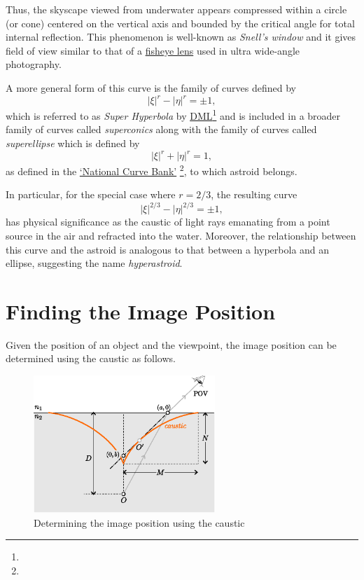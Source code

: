 \documentclass[twocolumn]{article}
\begin{document}
Thus, the skyscape viewed from underwater appears compressed within a circle (or cone) centered on the vertical axis and bounded by the critical angle for total internal reflection. This phenomenon is well-known as \emph{Snell's window} and it gives field of view  similar to that of a \href{https://en.wikipedia.org/wiki/Fisheye_lens}{fisheye lens} used in ultra wide-angle photography.

A more general form of this curve is the family of curves defined by
$$ \left| \xi \right|^{r} - \left| \eta \right|^{r} = \pm 1, $$
which is referred to as \emph{Super Hyperbola} by \href{http://dynamicmathematicslearning.com/super-ellipse.html}{DML}\footnote{} and is included in a broader family of curves called \emph{superconics} along with the family of curves called \emph{superellipse} which is defined by
$$ \left| \xi \right|^{r} + \left| \eta \right|^{r} = 1, $$ 
as defined in the  \href{https://old.nationalcurvebank.org/superconicncb/superconicncb.htm}{`National Curve Bank'}%
\footnote{}, to which astroid belongs.

In particular, for the special case where $r = 2/3$, the resulting curve
$$ \left| \xi \right|^{2/3} - \left| \eta \right|^{2/3} = \pm1, $$
has physical significance as the caustic of light rays emanating from a point source in the air and refracted into the water. Moreover, the relationship between this curve and the astroid is analogous to that between a hyperbola and an ellipse, suggesting the name \emph{hyperastroid}. 

\section{Finding the Image Position}

Given the position of an object and the viewpoint, the image position can be determined using the caustic as follows.

\begin{figure}[!h]
	\centering
	\includegraphics[width=2.7in]{figs/g394.eps}
	\caption{Determining the image position using the caustic}
	\label{fig:image_caustic}
\end{figure}
\end{document}
